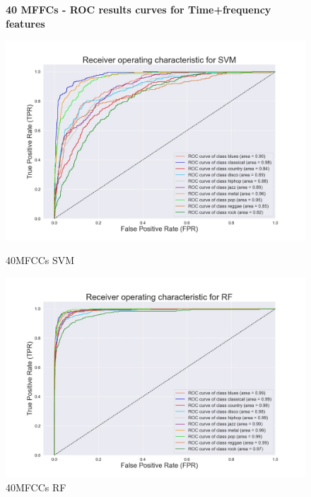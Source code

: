 \documentclass[conference]{IEEEtran}
\begin{document}
\begin{figure}[!ht]
    \begin{center}
        \small\textbf{40 MFFCs - ROC results curves for Time+frequency features}\par\medskip
        \begin{minipage}[t]{.24\textwidth}
            \centering
            \includegraphics[width=\textwidth]{plot/SL/all_features/40/SVM_40MFCC_10000_10GEN_GTZAN - ROC Plot.jpg}
            \caption{40MFCCs SVM}
            \label{fig:40MFCCs SVM Time+frequency Features}
        \end{minipage}
        \begin{minipage}[t]{.24\textwidth}
            \centering
            \includegraphics[width=\textwidth]{plot/SL/all_features/40/RF_40MFCC_10000_10GEN_GTZAN - ROC Plot.jpg}
            \caption{40MFCCs RF}
            \label{fig:40MFCCs RF Time+frequency Features}

\end{minipage}
\end{center}
\end{figure}
\end{document}
